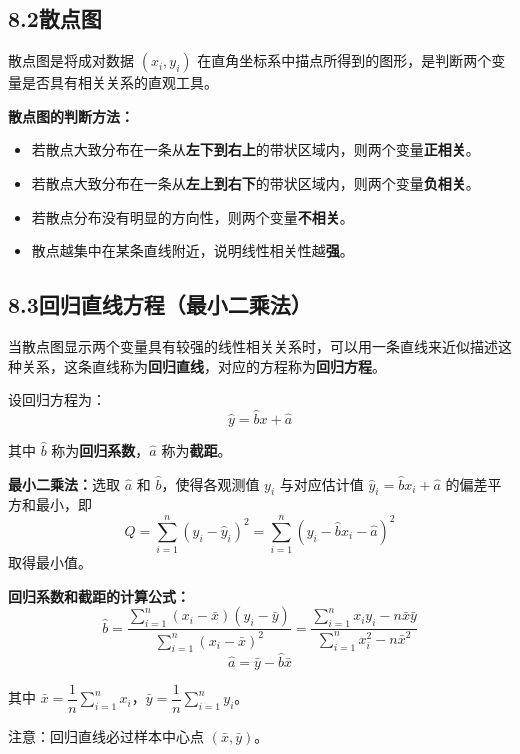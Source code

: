 \documentclass[12pt, a4paper]{ctexart}
\begin{document}
\subsection*{8.2\quad 散点图}

\begin{knowledgebox}[散点图]
散点图是将成对数据 $(x_i, y_i)$ 在直角坐标系中描点所得到的图形，是判断两个变量是否具有相关关系的直观工具。

\medskip
\textbf{散点图的判断方法：}
\begin{itemize}[leftmargin=2em]
  \item 若散点大致分布在一条从\textbf{左下到右上}的带状区域内，则两个变量\textbf{正相关}。
  \item 若散点大致分布在一条从\textbf{左上到右下}的带状区域内，则两个变量\textbf{负相关}。
  \item 若散点分布没有明显的方向性，则两个变量\textbf{不相关}。
  \item 散点越集中在某条直线附近，说明线性相关性越\textbf{强}。
\end{itemize}
\end{knowledgebox}

\subsection*{8.3\quad 回归直线方程（最小二乘法）}

\begin{knowledgebox}[一元线性回归方程]
当散点图显示两个变量具有较强的线性相关关系时，可以用一条直线来近似描述这种关系，这条直线称为\textbf{回归直线}，对应的方程称为\textbf{回归方程}。

\medskip
设回归方程为：
\[
\hat{y} = \hat{b}x + \hat{a}
\]

其中 $\hat{b}$ 称为\textbf{回归系数}，$\hat{a}$ 称为\textbf{截距}。

\medskip
\textbf{最小二乘法：}选取 $\hat{a}$ 和 $\hat{b}$，使得各观测值 $y_i$ 与对应估计值 $\hat{y}_i = \hat{b}x_i + \hat{a}$ 的偏差平方和最小，即
\[
Q = \sum_{i=1}^{n}(y_i - \hat{y}_i)^2 = \sum_{i=1}^{n}(y_i - \hat{b}x_i - \hat{a})^2
\]
取得最小值。

\medskip
\textbf{回归系数和截距的计算公式：}
\[
\boxed{\hat{b} = \frac{\displaystyle\sum_{i=1}^{n}(x_i - \bar{x})(y_i - \bar{y})}{\displaystyle\sum_{i=1}^{n}(x_i - \bar{x})^2} = \frac{\displaystyle\sum_{i=1}^{n}x_iy_i - n\bar{x}\bar{y}}{\displaystyle\sum_{i=1}^{n}x_i^2 - n\bar{x}^2}}
\]
\[
\boxed{\hat{a} = \bar{y} - \hat{b}\bar{x}}
\]

其中 $\bar{x} = \dfrac{1}{n}\displaystyle\sum_{i=1}^{n}x_i$，$\bar{y} = \dfrac{1}{n}\displaystyle\sum_{i=1}^{n}y_i$。

\medskip
注意：回归直线必过样本中心点 $(\bar{x}, \bar{y})$。
\end{knowledgebox}
\end{document}
